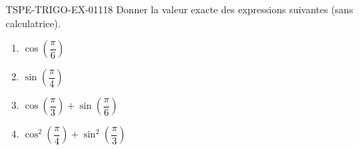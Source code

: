 \begin{exercice}{TSPE-TRIGO-EX-011}{1}{8}
Donner la valeur exacte des expressions suivantes (sans calculatrice).
\begin{enumerate}
  \item $\cos\!\left(\dfrac{\pi}{6}\right)$
  \item $\sin\!\left(\dfrac{\pi}{4}\right)$
  \item $\cos\!\left(\dfrac{\pi}{3}\right) + \sin\!\left(\dfrac{\pi}{6}\right)$
  \item $\cos^2\!\left(\dfrac{\pi}{4}\right) + \sin^2\!\left(\dfrac{\pi}{3}\right)$
\end{enumerate}
\end{exercice}
